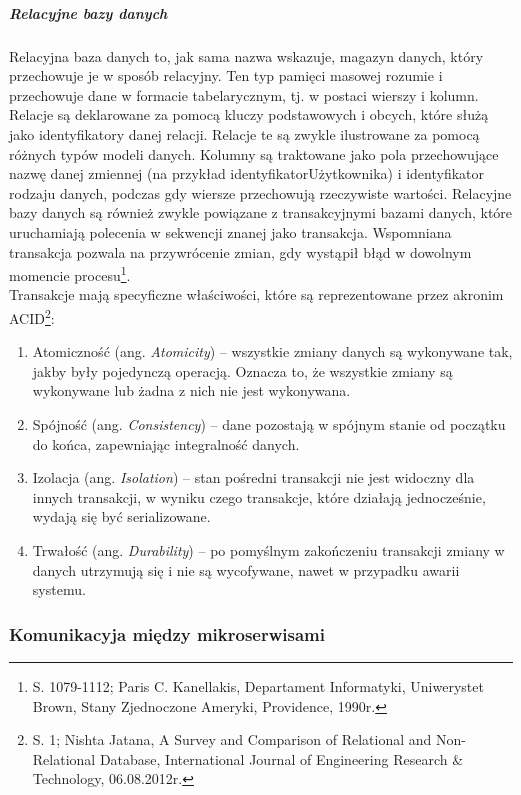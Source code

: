 \documentclass[12pt, a4paper, twoside, openany]{book}
\newcommand{\forceindent}{\leavevmode{\parindent=1.3em\indent}}
\begin{document}
\subparagraph{Relacyjne bazy danych\\}
\forceindent Relacyjna baza danych to, jak sama nazwa wskazuje, magazyn danych, który przechowuje je w sposób relacyjny.
Ten typ pamięci masowej rozumie i przechowuje dane w formacie tabelarycznym, tj. w postaci wierszy i kolumn.
Relacje są deklarowane za pomocą kluczy podstawowych i obcych, które służą jako identyfikatory danej relacji.
Relacje te są zwykle ilustrowane za pomocą różnych typów modeli danych.
Kolumny są traktowane jako pola przechowujące nazwę danej zmiennej (na przykład identyfikatorUżytkownika) i identyfikator rodzaju danych, podczas gdy wiersze przechowują rzeczywiste wartości.
Relacyjne bazy danych są również zwykle powiązane z transakcyjnymi bazami danych, które uruchamiają polecenia w sekwencji znanej jako transakcja.
Wspomniana transakcja pozwala na przywrócenie zmian, gdy wystąpił błąd w dowolnym momencie procesu\footnote{S. 1079-1112; Paris C. Kanellakis, Departament Informatyki, Uniwerystet Brown, Stany Zjednoczone Ameryki, Providence, 1990r.}.\\
\newpage
\forceindent Transakcje mają specyficzne właściwości, które są reprezentowane przez akronim ACID\footnote{S. 1; Nishta Jatana, A Survey and Comparison of Relational and Non-Relational Database, International Journal of Engineering Research \& Technology, 06.08.2012r.}:
\begin{enumerate}[label=--]
    \item Atomiczność (ang. \textit{Atomicity}) -- wszystkie zmiany danych są wykonywane tak, jakby były pojedynczą operacją. Oznacza to, że wszystkie zmiany są wykonywane lub żadna z nich nie jest wykonywana.
    \item Spójność (ang. \textit{Consistency}) -- dane pozostają w spójnym stanie od początku do końca, zapewniając integralność danych.
    \item Izolacja (ang. \textit{Isolation}) -- stan pośredni transakcji nie jest widoczny dla innych transakcji, w wyniku czego transakcje, które działają jednocześnie, wydają się być serializowane.
    \item Trwałość (ang. \textit{Durability}) -- po pomyślnym zakończeniu transakcji zmiany w danych utrzymują się i nie są wycofywane, nawet w przypadku awarii systemu.
\end{enumerate}


\subsubsection{Komunikacyja między mikroserwisami}
\end{document}
